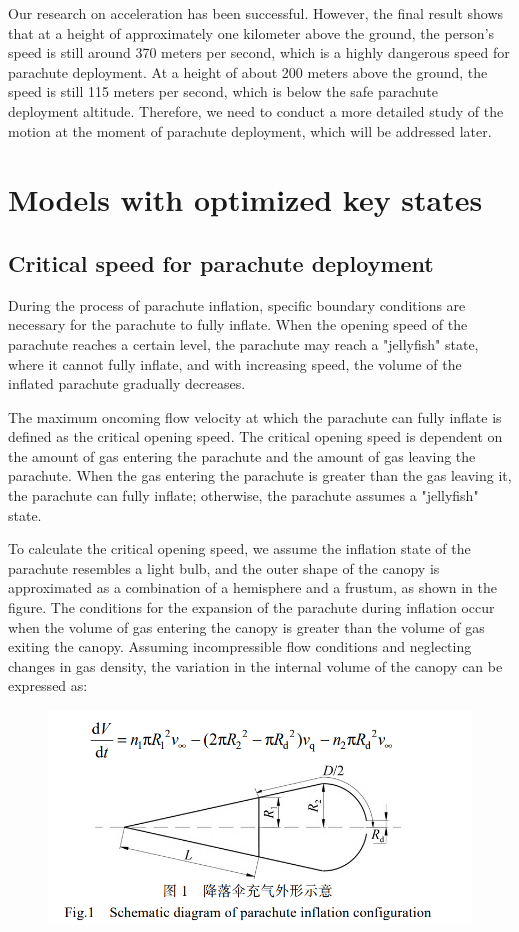 \documentclass[12pt]{article}
\begin{document}
Our research on acceleration has been successful. However, 
the final result shows that at a height of approximately one kilometer 
above the ground, the person's speed is still around 370 meters per second, 
which is a highly dangerous speed for parachute deployment. At a height of about 
200 meters above the ground, the speed is still 115 meters per second, which is below 
the safe parachute deployment altitude. Therefore, we need to conduct a more detailed 
study of the motion at the moment of parachute deployment, which will be addressed later.

\section{Models with optimized key states}

\subsection{Critical speed for parachute deployment}
During the process of parachute inflation, specific boundary conditions are 
necessary for the parachute to fully inflate. When the opening speed of the parachute 
reaches a certain level, the parachute may reach a "jellyfish" state, where it cannot fully 
inflate, and with increasing speed, the volume of the inflated parachute gradually decreases.

The maximum oncoming flow velocity at which the parachute can fully inflate is defined as 
the critical opening speed. The critical opening speed is dependent on the amount of gas 
entering the parachute and the amount of gas leaving the parachute. When the gas entering 
the parachute is greater than the gas leaving it, the parachute can fully inflate; otherwise, 
the parachute assumes a "jellyfish" state.

To calculate the critical opening speed, we assume the inflation state of the parachute resembles 
a light bulb, and the outer shape of the canopy is approximated as a combination of a hemisphere and 
a frustum, as shown in the figure. The conditions for the expansion of the parachute during inflation 
occur when the volume of gas entering the canopy is greater than the volume of gas exiting the canopy. 
Assuming incompressible flow conditions and neglecting changes in gas density, the variation in the internal 
volume of the canopy can be expressed as:

\begin{figure}[!hbtp]
    \centering 
    \includegraphics[width = 0.8\linewidth]{image/015.png}
\end{figure}
\end{document}

